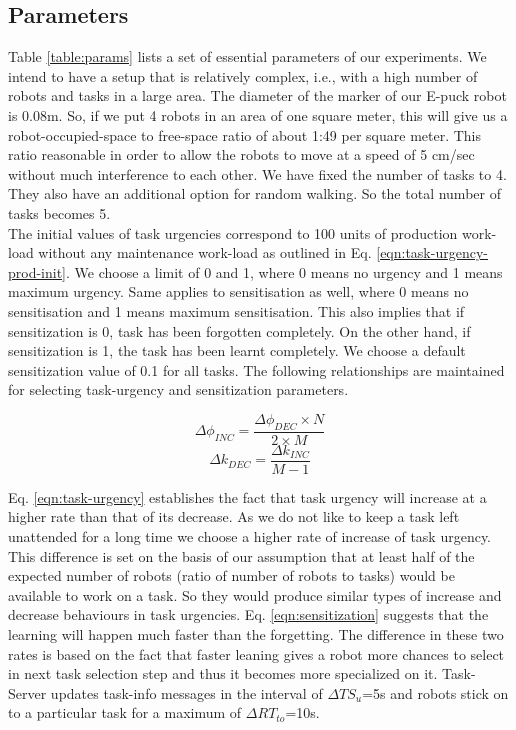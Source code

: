 \documentclass{llncs}
\begin{document}
\subsection{Parameters}
Table \ref{table:params} lists a set of essential parameters of our experiments. We intend to have a setup that is relatively complex, i.e., with a high number of robots and tasks in a large area. The diameter of the marker of our E-puck robot is 0.08m. So, if we put 4 robots in an area of one square meter, this will give us a robot-occupied-space to free-space ratio of about 1:49 per square meter. This ratio reasonable in order to allow the robots to move at a speed of 5 cm/sec  without much interference to each other. We have fixed the number of tasks to 4. They also have an additional option for random walking. So the total number of tasks becomes 5.\\
The initial values of task urgencies correspond to 100 units of production work-load without any maintenance work-load as outlined in Eq. \ref{eqn:task-urgency-prod-init}. We choose a limit of 0 and 1, where 0 means no urgency and 1 means maximum urgency. Same applies to sensitisation as well, where 0 means no sensitisation and 1 means maximum sensitisation. This also implies that if sensitization is 0, task has been forgotten completely. On the other hand, if sensitization is 1, the task has been learnt completely. We choose a default sensitization value of 0.1 
for all tasks. The following relationships are maintained for selecting task-urgency and sensitization parameters.
\begin{small}
\begin{equation}
\Delta\phi_{INC} =  \frac{\Delta\phi_{DEC} \times N}{2 \times M}
\label{eqn:task-urgency}
\end{equation}
%
\begin{equation}
\Delta k_{DEC} = \frac{\Delta k_{INC}} {M - 1} 
\label{eqn:sensitization}
\end{equation}
\end{small}
%
Eq. \ref{eqn:task-urgency} establishes the fact that task urgency will increase at a higher rate than that of its decrease. As we do not like to keep a task left unattended for a long time we choose a higher rate of increase of task urgency. This difference is set on the basis of our assumption that at least half of the expected number of robots (ratio of number of robots to tasks) would be available to work on a task. So they would produce similar types of increase and decrease behaviours in task urgencies.
Eq. \ref{eqn:sensitization} suggests that the learning will happen much faster than the forgetting. The difference in these two rates is based on the fact that faster leaning gives a robot more chances to select in next task selection step and thus it becomes more specialized on it.  Task-Server updates task-info messages in the interval of $\Delta TS_u$=5s and robots stick on to a particular task for a maximum of  $\Delta RT_{to}$=10s.
\end{document}
